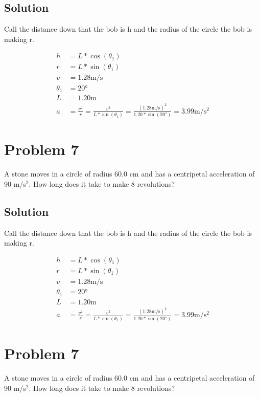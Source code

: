 \documentclass[12pt]{article}
\begin{document}
\subsection*{Solution}
Call the distance down that the bob is h and the radius of the circle the bob is making r.

\begin{align}
    h &= L*\cos(\theta_1)\\
    r &= L*\sin(\theta_1)\\
    v &= 1.28 \unit{\meter/\second}\\
    \theta_1 &= 20 \unit{\degree}\\
    L &= 1.20 \unit{\meter}\\
    a &= \frac{v^2}{r} = \frac{v^2}{L*\sin(\theta_1)} = \frac{(1.28 \unit{\meter/\second})^2}{1.20 * \sin(20\unit{\degree})} = \boxed{3.99 \unit{\meter/\second^2}}
\end{align}


\pagebreak
\section*{Problem 7}
A stone moves in a circle of radius 60.0 cm and has a centripetal acceleration of 90 m/s$^2$. How
long does it take to make 8 revolutions?
\subsection*{Solution}
Call the distance down that the bob is h and the radius of the circle the bob is making r.

\begin{align}
    h &= L*\cos(\theta_1)\\
    r &= L*\sin(\theta_1)\\
    v &= 1.28 \unit{\meter/\second}\\
    \theta_1 &= 20 \unit{\degree}\\
    L &= 1.20 \unit{\meter}\\
    a &= \frac{v^2}{r} = \frac{v^2}{L*\sin(\theta_1)} = \frac{(1.28 \unit{\meter/\second})^2}{1.20 * \sin(20\unit{\degree})} = \boxed{3.99 \unit{\meter/\second^2}}
\end{align}


\pagebreak
\section*{Problem 7}
A stone moves in a circle of radius 60.0 cm and has a centripetal acceleration of 90 m/s$^2$. How
long does it take to make 8 revolutions?
\end{document}
